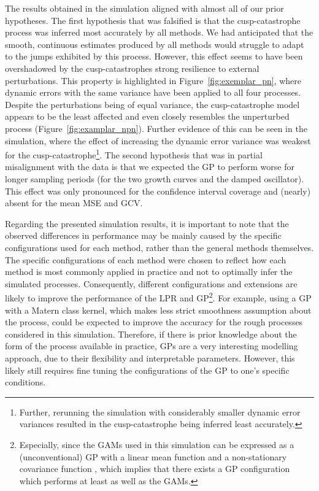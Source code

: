 \documentclass[man, floatsintext]{apa7}
\begin{document}
The results obtained in the simulation aligned with almost all of our prior
hypotheses. The first hypothesis that was falsified is that the
cusp-catastrophe process was inferred most accurately by all methods. We had
anticipated that the smooth, continuous estimates produced by all methods would
struggle to adapt to the jumps exhibited by this process. However, this effect
seems to have been overshadowed by the cusp-catastrophes strong resilience to
external perturbations. This property is highlighted in
Figure~\ref{fig:exemplar_pn}, where dynamic errors with the same variance have
been applied to all four processes. Despite the perturbations being of equal
variance, the cusp-catastrophe model appears to be the least affected and even
closely resembles the unperturbed process (Figure~\ref{fig:examplar_npn}).
Further evidence of this can be seen in the simulation, where the effect of
increasing the dynamic error variance was weakest for the
cusp-catastrophe\footnote{Further, rerunning the simulation with considerably
  smaller dynamic error variances resulted in the cusp-catastrophe being
  inferred
  least accurately.}. The second hypothesis that was in partial misalignment
with
the data is that we expected the GP to perform worse for longer sampling
periods (for the two growth curves and the damped oscillator). This effect was
only pronounced for the confidence interval coverage and (nearly) absent for
the mean MSE and GCV\@.

Regarding the presented simulation results, it is important to note that the
observed differences in performance may be mainly caused by the specific
configurations used for each method, rather than the general methods
themselves. The specific configurations of each method were chosen to reflect
how each method is most commonly applied in practice and not to optimally infer
the simulated processes. Consequently, different configurations and extensions
are likely to improve the performance of the LPR and GP\footnote{Especially,
  since the GAMs used in this simulation can be expressed as a (unconventional)
  GP with a linear mean function and a non-stationary covariance function
  \parencite{wahba_improper_1978, rasmussen_gaussian_2006}, which implies that
  there exists a GP configuration which performs at least as well as the
  GAMs.}.
For example, using a GP with a Matern class kernel, which makes less strict
smoothness assumption about the process, could be expected to improve the
accuracy for the rough processes considered in this simulation. Therefore, if
there is prior knowledge about the form of the process available in practice,
GPs are a very interesting modelling approach, due to their flexibility and
interpretable parameters. However, this likely still requires fine tuning the
configurations of the GP to one's specific conditions.
\end{document}
